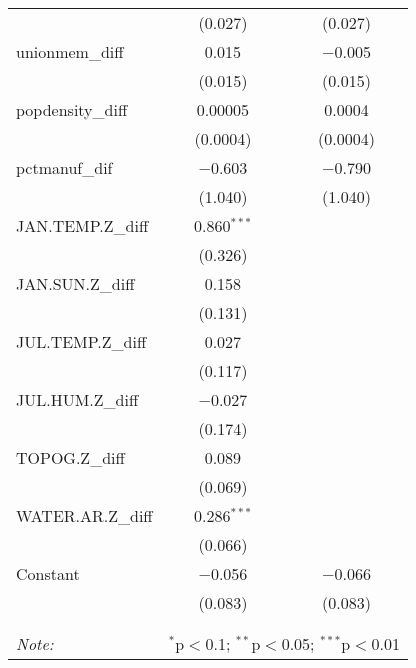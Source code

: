 \begin{table}[!htbp]
\begin{tabular}{@{\extracolsep{5pt}}lcc}
  & (0.027) & (0.027) \\ 
  unionmem\_diff & 0.015 & $-$0.005 \\ 
  & (0.015) & (0.015) \\ 
  popdensity\_diff & 0.00005 & 0.0004 \\ 
  & (0.0004) & (0.0004) \\ 
  pctmanuf\_dif & $-$0.603 & $-$0.790 \\ 
  & (1.040) & (1.040) \\ 
  JAN.TEMP.Z\_diff & 0.860$^{***}$ &  \\ 
  & (0.326) &  \\ 
  JAN.SUN.Z\_diff & 0.158 &  \\ 
  & (0.131) &  \\ 
  JUL.TEMP.Z\_diff & 0.027 &  \\ 
  & (0.117) &  \\ 
  JUL.HUM.Z\_diff & $-$0.027 &  \\ 
  & (0.174) &  \\ 
  TOPOG.Z\_diff & 0.089 &  \\ 
  & (0.069) &  \\ 
  WATER.AR.Z\_diff & 0.286$^{***}$ &  \\ 
  & (0.066) &  \\ 
  Constant & $-$0.056 & $-$0.066 \\ 
  & (0.083) & (0.083) \\ 
 \hline \\[-1.8ex] 
\hline 
\hline \\[-1.8ex] 
\textit{Note:}  & \multicolumn{2}{r}{$^{*}$p$<$0.1; $^{**}$p$<$0.05; $^{***}$p$<$0.01} \\ 
\end{tabular} 
\end{table} 
